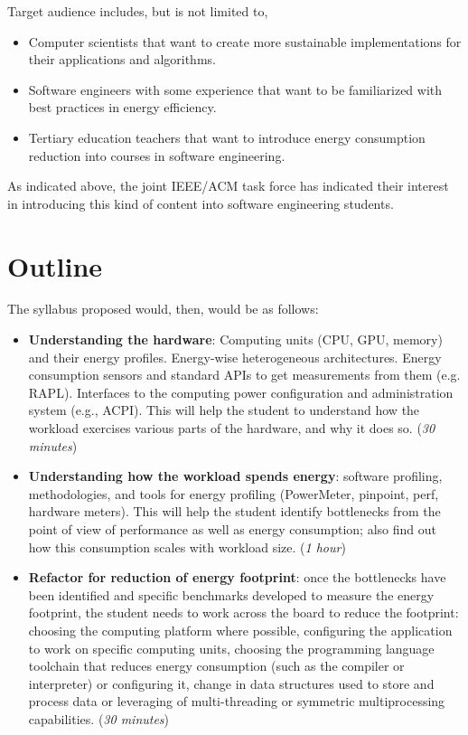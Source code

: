 \documentclass[a4paper]{article}
\begin{document}
Target audience includes, but is not limited to, \begin{itemize}
  \item Computer scientists that want to create more sustainable implementations
    for their applications and algorithms.
  \item Software engineers with some experience that want to be familiarized
    with best practices in energy efficiency.
    \item Tertiary education teachers that want to introduce energy consumption
      reduction into courses in software engineering.
\end{itemize} 

As indicated above, the joint IEEE/ACM task force has indicated their interest
in introducing this kind of content into software engineering students.

\section{Outline}

 The syllabus proposed
would, then, would be as follows:\begin{itemize}
\item {\bf Understanding the hardware}: Computing units (CPU, GPU, memory) and
  their energy profiles. Energy-wise heterogeneous architectures. Energy
  consumption sensors and standard APIs to get measurements from them
  (e.g. RAPL). Interfaces to the computing power configuration and
  administration system (e.g., ACPI). This will help the student to understand
  how the workload exercises various parts of the hardware, and why it does
  so. ({\em 30 minutes})
\item {\bf Understanding how the workload spends energy}: software profiling,
  methodologies, and tools for energy profiling (PowerMeter, {\sf pinpoint},
  {\sf perf}, hardware meters). This will help the student identify bottlenecks
  from the point of view of performance as well as energy consumption; also find
  out how this consumption scales with workload size. ({\em 1 hour})
\item {\bf Refactor for reduction of energy footprint}: once the bottlenecks
  have been identified and specific benchmarks developed to measure the energy
  footprint, the student needs to work across the board to reduce the footprint:
  choosing the computing platform where possible, configuring the application to
  work on specific computing units, choosing the programming language toolchain
  that reduces energy consumption (such as the compiler or interpreter) or
  configuring it, change
  in data structures used to store and process data or leveraging of
  multi-threading or symmetric multiprocessing capabilities. ({\em 30 minutes})
\end{itemize}
\end{document}
